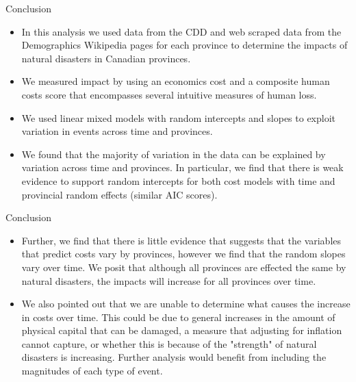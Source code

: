 \begin{frame}{Conclusion}
\begin{itemize}
\item In this analysis we used data from the CDD and web scraped data from the Demographics Wikipedia pages for each province to determine the impacts of natural disasters in Canadian provinces. 
\item We measured impact by using an economics cost and a composite human costs score that encompasses several intuitive measures of human loss.
\item We used linear mixed models with random intercepts and slopes to exploit variation in events across time and provinces.
\item  We found that the majority of variation in the data can be explained by variation across time and provinces. In particular, we find that there is weak evidence to support random intercepts for both cost models with time and provincial random effects (similar AIC scores).


\end{itemize}
\end{frame}

\begin{frame}{Conclusion}
\begin{itemize}

	\item Further, we find that there is little evidence that suggests that the variables that predict costs vary by provinces, however we find that the random slopes vary over time. We posit that although all provinces are effected the same by natural disasters, the impacts will increase for all provinces over time.
	\item We also pointed out that we are unable to determine what causes the increase in costs over time. This could be due to general increases in the amount of physical capital that can be damaged, a measure that adjusting for inflation cannot capture, or whether this is because of the "strength" of natural disasters is increasing. Further analysis would benefit from including the magnitudes of each type of event. 
	
\end{itemize}
\end{frame}
